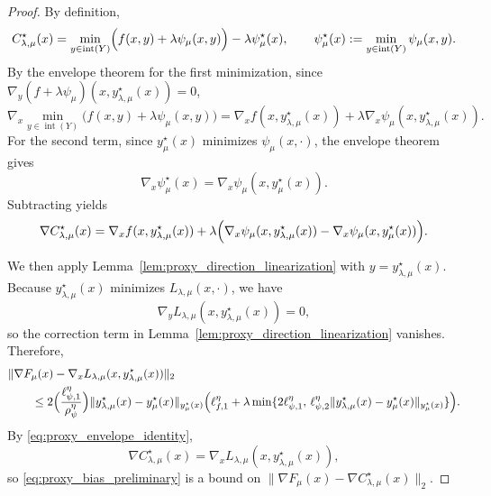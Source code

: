 \documentclass{article}
\begin{document}
\begin{proof}
By definition,
\[
C_{\lambda,\mu}^\star(x)
=
\min_{y\in\operatorname{int}(Y)}
\Bigl(f(x,y)+\lambda\psi_\mu(x,y)\Bigr)
-
\lambda\psi_\mu^\star(x),
\qquad
\psi_\mu^\star(x):=\min_{y\in\operatorname{int}(Y)}\psi_\mu(x,y).
\]
By the envelope theorem for the first minimization, since
\(\nabla_y(f+\lambda\psi_\mu)(x,y_{\lambda,\mu}^\star(x))=0\),
\[
\nabla_x
\min_{y\in\operatorname{int}(Y)}
\bigl(f(x,y)+\lambda\psi_\mu(x,y)\bigr)
=
\nabla_x f(x,y_{\lambda,\mu}^\star(x))
+
\lambda\nabla_x\psi_\mu(x,y_{\lambda,\mu}^\star(x)).
\]
For the second term, since \(y_\mu^\star(x)\) minimizes \(\psi_\mu(x,\cdot)\), the envelope theorem gives
\[
\nabla_x\psi_\mu^\star(x)=\nabla_x\psi_\mu(x,y_\mu^\star(x)).
\]
Subtracting yields
\begin{equation}
\label{eq:proxy_envelope_identity}
\nabla C_{\lambda,\mu}^\star(x)
=
\nabla_x f(x,y_{\lambda,\mu}^\star(x))
+
\lambda\Bigl(
\nabla_x\psi_\mu(x,y_{\lambda,\mu}^\star(x))
-
\nabla_x\psi_\mu(x,y_\mu^\star(x))
\Bigr).
\end{equation}

\smallskip
We then apply Lemma~\ref{lem:proxy_direction_linearization} with \(y=y_{\lambda,\mu}^\star(x)\). Because
\(y_{\lambda,\mu}^\star(x)\) minimizes \(L_{\lambda,\mu}(x,\cdot)\), we have
\[
\nabla_y L_{\lambda,\mu}(x,y_{\lambda,\mu}^\star(x))=0,
\]
so the correction term in Lemma~\ref{lem:proxy_direction_linearization} vanishes. Therefore,
\begin{equation}
\label{eq:proxy_bias_preliminary}
\begin{aligned}
&\|\nabla F_\mu(x)-\nabla_x L_{\lambda,\mu}(x,y_{\lambda,\mu}^\star(x))\|_2 \\
&\qquad\le
2\Bigl(\frac{\ell_{\psi,1}^\eta}{\rho_\psi^\eta}\Bigr)
\|y_{\lambda,\mu}^\star(x)-y_\mu^\star(x)\|_{y_\mu^\star(x)}
\Bigl(
\ell_{f,1}^\eta
+
\lambda\min\{
2\ell_{\psi,1}^\eta,\,
\ell_{\psi,2}^\eta
\|y_{\lambda,\mu}^\star(x)-y_\mu^\star(x)\|_{y_\mu^\star(x)}
\}
\Bigr).
\end{aligned}
\end{equation}
By \eqref{eq:proxy_envelope_identity},
\[
\nabla C_{\lambda,\mu}^\star(x)
=
\nabla_x L_{\lambda,\mu}(x,y_{\lambda,\mu}^\star(x)),
\]
so \eqref{eq:proxy_bias_preliminary} is a bound on
\(\|\nabla F_\mu(x)-\nabla C_{\lambda,\mu}^\star(x)\|_2\).


\end{proof}
\end{document}
